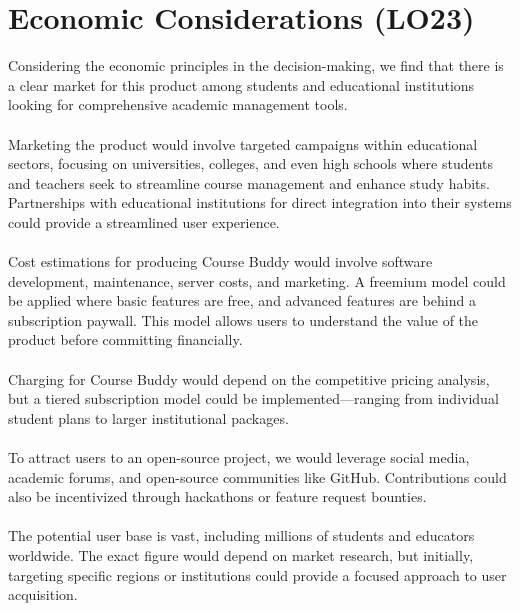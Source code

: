 \documentclass{article}
\begin{document}
\section{Economic Considerations (LO23)}


Considering the economic principles in the decision-making, we find that there is a clear market for this product among students and educational institutions looking for comprehensive academic management tools.\\
\\
Marketing the product would involve targeted campaigns within educational sectors, focusing on universities, colleges, and even high schools where students and teachers seek to streamline course management and enhance study habits. Partnerships with educational institutions for direct integration into their systems could provide a streamlined user experience.\\
\\
Cost estimations for producing Course Buddy would involve software development, maintenance, server costs, and marketing. A freemium model could be applied where basic features are free, and advanced features are behind a subscription paywall. This model allows users to understand the value of the product before committing financially.\\
\\
Charging for Course Buddy would depend on the competitive pricing analysis, but a tiered subscription model could be implemented—ranging from individual student plans to larger institutional packages.\\
\\
To attract users to an open-source project, we would leverage social media, academic forums, and open-source communities like GitHub. Contributions could also be incentivized through hackathons or feature request bounties.\\
\\
The potential user base is vast, including millions of students and educators worldwide. The exact figure would depend on market research, but initially, targeting specific regions or institutions could provide a focused approach to user acquisition.
\end{document}
